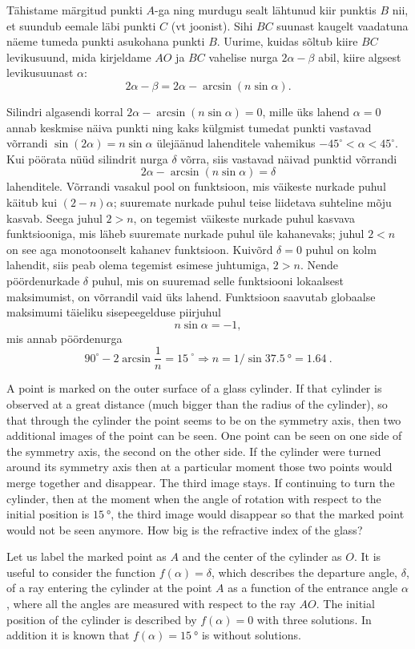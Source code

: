 {Tähistame märgitud punkti $A$-ga ning murdugu sealt lähtunud kiir punktis $B$ nii, et suundub eemale läbi punkti $C$ (vt joonist).
Sihi $BC$ suunast kaugelt vaadatuna näeme tumeda punkti asukohana punkti $B$. Uurime, kuidas sõltub kiire $BC$ levikusuund, mida kirjeldame 
$AO$ ja $BC$ vahelise nurga $2\alpha-\beta$ abil, kiire algsest levikusuunast $\alpha$:
$$2\alpha-\beta= 2\alpha-\arcsin (n\sin\alpha).$$

Silindri algasendi korral $2\alpha-\arcsin (n\sin\alpha) =0$, mille üks lahend $\alpha=0$ annab keskmise näiva punkti
ning kaks külgmist tumedat punkti vastavad võrrandi $\sin(2\alpha)=n\sin\alpha$ ülejäänud lahenditele vahemikus $-45^\circ <\alpha<45^\circ$.
Kui pöörata nüüd silindrit nurga $\delta$ võrra, siis vastavad näivad punktid võrrandi 
$$2\alpha-\arcsin (n\sin\alpha) =\delta$$
lahenditele. Võrrandi vasakul pool on funktsioon, mis väikeste nurkade puhul käitub kui $(2-n)\alpha$; suuremate nurkade puhul teise liidetava suhteline mõju kasvab.
Seega juhul $2>n$, on tegemist väikeste nurkade puhul kasvava funktsiooniga, mis läheb suuremate nurkade puhul üle kahanevaks;
juhul $2<n$ on see aga monotoonselt kahanev funktsioon. Kuivõrd $\delta=0$ puhul on kolm lahendit, siis peab olema tegemist esimese juhtumiga, $2>n$.
Nende pöördenurkade $\delta$ puhul, mis on suuremad selle funktsiooni lokaalsest maksimumist, on võrrandil vaid üks lahend.
Funktsioon saavutab globaalse maksimumi täieliku sisepeegelduse piirjuhul 
$$n\sin\alpha=-1,$$
mis annab pöördenurga
$$90^\circ-2\arcsin \frac 1n=\SI{15}{}^\circ\Rightarrow n=1/\sin \SI{37,5}{\degree} = \SI{1,64}{}.$$
\fi


\ifEngStatement
A point is marked on the outer surface of a glass cylinder. If that cylinder is observed at a great distance (much bigger than the radius of the cylinder), so that through the cylinder the point seems to be on the symmetry axis, then two additional images of the point can be seen. One point can be seen on one side of the symmetry axis, the second on the other side. If the cylinder were turned around its symmetry axis then at a particular moment those two points would merge together and disappear. The third image stays. If continuing to turn the cylinder, then at the moment when the angle of rotation with respect to the initial position is $\SI{15}{\degree}$, the third image would disappear so that the marked point would not be seen anymore. How big is the refractive index of the glass?
\fi


\ifEngHint
Let us label the marked point as $A$ and the center of the cylinder as $O$. It is useful to consider the function $f(\alpha) = \delta$, which describes the departure angle, $\delta$, of a ray entering the cylinder at the point $A$ as a function of the entrance angle $\alpha$, where all the angles are measured with respect to the ray $AO$. The initial position of the cylinder is described by $f(\alpha) = 0$ with three solutions. In addition it is known that $f(\alpha) = \SI{15}{\degree}$ is without solutions.
\fi


}
